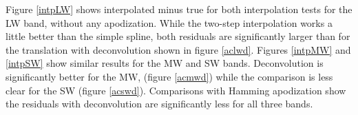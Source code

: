 \documentclass[12pt]{article}
\begin{document}
Figure \ref{intpLW} shows interpolated {\cris} minus true {\cris}
for both interpolation tests for the LW band, without any
apodization.  While the two-step interpolation works a little better
than the simple spline, both residuals are significantly larger than
for the translation with deconvolution shown in figure \ref{aclwd}.
Figures \ref{intpMW} and \ref{intpSW} show similar results for the
MW and SW bands.  Deconvolution is significantly better for the MW,
(figure \ref{acmwd}) while the comparison is less clear for the SW
(figure \ref{acswd}).  Comparisons with Hamming apodization show the
residuals with deconvolution are significantly less for all three
bands.

% 
% 
%   
% 
% 
% 



\end{document}
